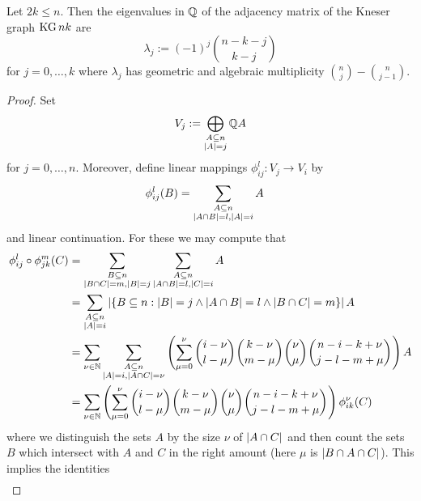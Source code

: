 \documentclass[a4paper]{article}
\begin{document}
\begin{lemma}
  Let $2k\leq n$. Then the eigenvalues in $\mathbb{Q}$ of the adjacency matrix of the Kneser graph $\mathop\mathrm{KG}{n}{k}$ are
  \begin{equation}
    \lambda_j:=(-1)^j\binom{n-k-j}{k-j}
  \end{equation}
  for $j=0,\ldots,k$ where $\lambda_j$ has geometric and algebraic multiplicity $\binom{n}{j}-\binom{n}{j-1}$.
\end{lemma}

\begin{proof}
  Set 
  \begin{align}
    V_j:=\bigoplus_{\substack{A\subseteq n\\ \left|A\right|=j}}{\mathbb{Q} A}
  \end{align}
  for $j=0,\ldots,n$.
  Moreover, define linear mappings $\phi^l_{ij}:V_j\to V_i$ by
  \begin{align}
      \phi^l_{ij}(B) & = \sum_{\substack{A\subseteq n\\ \left|A\cap B\right|=l, \left|A\right|=i}}{A}
  \end{align}
  and linear continuation.
  For these we may compute that
  \begin{align*}
      \phi^l_{ij}\compose\phi^m_{jk}(C)
      &= \sum_{\substack{B\subseteq n\\ \card{B\setmeet C}=m, \card{B}=j}}{\sum_{\substack{A\subseteq n\\ \card{A\setmeet B}=l, \card{C}=i}}{A}}\\
      & = \sum_{\substack{A\subseteq n\\ \card{A}=i}}{\card{\{B\subseteq n: \card{B}=j\lgand\card{A\setmeet B}=l\lgand\card{B\setmeet C}=m\}}{A}}\\
      & = \sum_{\nu\in\nats}{\sum_{\substack{A\subseteq n\\ \card{A}=i, \card{A\setmeet C}=\nu}}{\left(\sum_{\mu=0}^{\nu}{\binom{i-\nu}{l-\mu}\binom{k-\nu}{m-\mu}\binom{\nu}{\mu}\binom{n-i-k+\nu}{j-l-m+\mu}}\right)A}}\\
      & = \sum_{\nu\in\nats}{\left(\sum_{\mu=0}^{\nu}{\binom{i-\nu}{l-\mu}\binom{k-\nu}{m-\mu}\binom{\nu}{\mu}\binom{n-i-k+\nu}{j-l-m+\mu}}\right)\phi^{\nu}_{ik}(C)}
  \end{align*}
  where we distinguish the sets $A$ by the size $\nu$ of $\left|A\cap C\right|$ and then count the sets $B$ which intersect with $A$ and $C$ in the right amount (here $\mu$ is $\left|B\cap A\cap C\right|$).
  This implies the identities
  \begin{align}

\end{align}
\end{proof}
\end{document}

